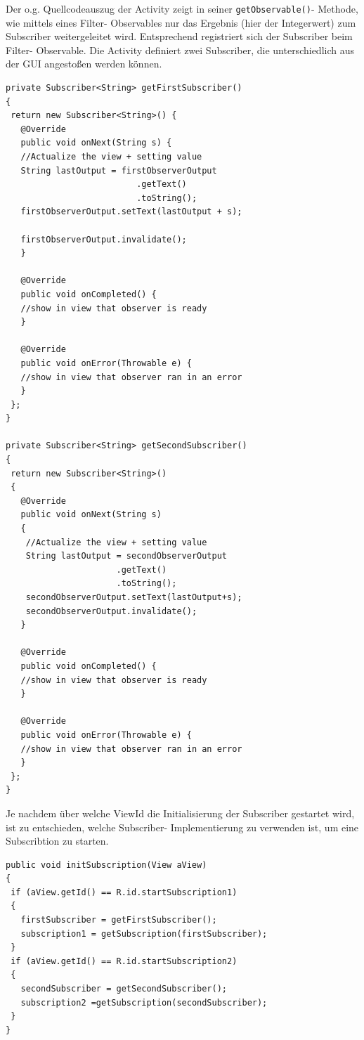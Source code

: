 \documentclass[12pt,oneside,a4paper,bibtotoc,liststotoc]{scrreprt}
\begin{document}
Der o.g. Quellcodeauszug der Activity zeigt in seiner \texttt{getObservable()}- Methode, wie mittels eines Filter- Observables nur das Ergebnis (hier der Integerwert) zum Subscriber weitergeleitet wird. Entsprechend registriert sich der Subscriber beim Filter- Observable. Die Activity definiert zwei Subscriber, die unterschiedlich aus der GUI angestoßen werden können.\newline
\begin{lstlisting}
private Subscriber<String> getFirstSubscriber() 
{
 return new Subscriber<String>() {
   @Override
   public void onNext(String s) {
   //Actualize the view + setting value
   String lastOutput = firstObserverOutput
                          .getText()
                          .toString();
   firstObserverOutput.setText(lastOutput + s);

   firstObserverOutput.invalidate();
   }

   @Override
   public void onCompleted() {
   //show in view that observer is ready
   }

   @Override
   public void onError(Throwable e) {
   //show in view that observer ran in an error
   }
 };
}

private Subscriber<String> getSecondSubscriber() 
{
 return new Subscriber<String>() 
 {
   @Override
   public void onNext(String s) 
   {
    //Actualize the view + setting value
    String lastOutput = secondObserverOutput
                      .getText()
                      .toString();
    secondObserverOutput.setText(lastOutput+s);
    secondObserverOutput.invalidate();
   }

   @Override
   public void onCompleted() {
   //show in view that observer is ready
   }

   @Override
   public void onError(Throwable e) {
   //show in view that observer ran in an error
   }
 };
}
\end{lstlisting}
Je nachdem über welche ViewId die Initialisierung der Subscriber gestartet wird, ist zu entschieden, welche Subscriber- Implementierung zu verwenden ist, um eine Subscribtion zu starten.\newpage
\begin{lstlisting}
public void initSubscription(View aView)
{
 if (aView.getId() == R.id.startSubscription1) 
 {
   firstSubscriber = getFirstSubscriber();
   subscription1 = getSubscription(firstSubscriber);
 }
 if (aView.getId() == R.id.startSubscription2) 
 {
   secondSubscriber = getSecondSubscriber();
   subscription2 =getSubscription(secondSubscriber);
 }
}
\end{lstlisting}
\end{document}
